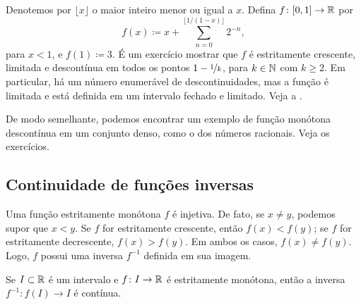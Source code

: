 \begin{example} \label{example:countdiscont}
Denotemos por $\lfloor x \rfloor$ o maior inteiro menor ou igual a $x$.
Defina $f \colon [0,1] \to {\mathbb{R}}$ por
\begin{equation*}
f(x) \coloneqq
x +
\sum_{n=0}^{\lfloor 1/(1-x) \rfloor}
2^{-n} ,
\end{equation*}
para $x < 1$, e $f(1) \coloneqq 3$.
É um exercício mostrar que $f$ é estritamente crescente, limitada e
descontínua em todos os pontos $1-\nicefrac{1}{k}$, para $k \in {\mathbb{N}}$ com $k \geq 2$. Em particular,
há um número enumerável de descontinuidades, mas a função é limitada e está definida em um intervalo fechado e limitado. Veja a .
\begin{myfigureht}
\caption{Função estritamente crescente em $[0,1]$ com um número enumerável de
descontinuidades.\label{fig:countdiscont}}
\end{myfigureht}

De modo semelhante, podemos encontrar um exemplo de função monótona descontínua em um conjunto denso,
como o dos números racionais. Veja os exercícios.
\end{example}

\subsection{Continuidade de funções inversas}

Uma função estritamente monótona $f$ é injetiva.
De fato, se $x \neq y$, podemos supor que $x < y$. Se $f$ for estritamente crescente, então $f(x) < f(y)$; se $f$ for estritamente decrescente, $f(x) > f(y)$. Em ambos os casos, $f(x) \neq f(y)$.
Logo, $f$ possui uma inversa $f^{-1}$ definida em sua imagem.

\begin{prop} \label{prop:invcont}
Se $I \subset {\mathbb{R}}$ é um intervalo e $f \colon I \to {\mathbb{R}}$ é estritamente
monótona, então a inversa $f^{-1} \colon f(I) \to I$ é contínua.
\end{prop}

